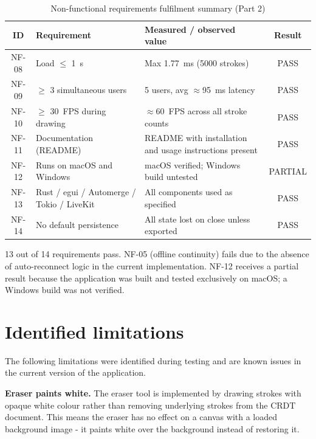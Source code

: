 \documentclass[a4paper,11pt,twoside]{report}
\theoremstyle{definition}
\begin{document}
\begin{table}[H]
    \centering
    \caption{Non-functional requirements fulfilment summary (Part 2)}
    \begin{tabular}{|c|p{}|p{}|c|}
        \hline
        \textbf{ID} & \textbf{Requirement} & \textbf{Measured / observed value} & \textbf{Result} \\
        \hline
        NF-08 & Load $\leq$ 1~s & Max 1.77~ms (5000 strokes) & PASS \\
        \hline
        NF-09 & $\geq$ 3 simultaneous users & 5 users, avg $\approx$95~ms latency & PASS \\
        \hline
        NF-10 & $\geq$ 30~FPS during drawing & $\approx$60~FPS across all stroke counts & PASS \\
        \hline
        NF-11 & Documentation (README) & README with installation and usage instructions present & PASS \\
        \hline
        NF-12 & Runs on macOS and Windows & macOS verified; Windows build untested & PARTIAL \\
        \hline
        NF-13 & Rust / egui / Automerge / Tokio / LiveKit & All components used as specified & PASS \\
        \hline
        NF-14 & No default persistence & All state lost on close unless exported & PASS \\
        \hline
    \end{tabular}
    \label{tab:nf-summary-2}
\end{table}

13 out of 14 requirements pass. NF-05 (offline continuity) fails due to the absence of
auto-reconnect logic in the current implementation. NF-12 receives a partial result
because the application was built and tested exclusively on macOS; a Windows build was
not verified.
\section{Identified limitations}

The following limitations were identified during testing and are known issues in the
current version of the application.

\textbf{Eraser paints white.} The eraser tool is implemented by drawing strokes with
opaque white colour rather than removing underlying strokes from the CRDT document.
This means the eraser has no effect on a canvas with a loaded background image -
it paints white over the background instead of restoring it.
\end{document}
